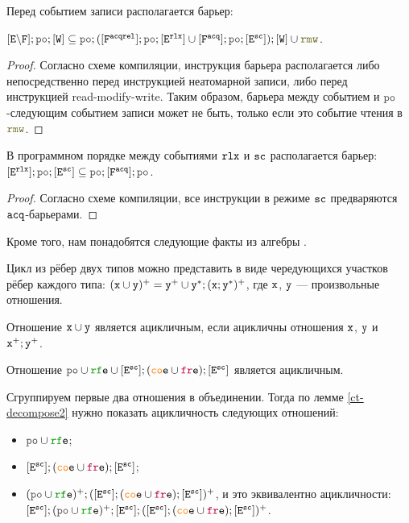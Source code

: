 \begin{lm}  \label{sb-w-sync}
  Перед событием записи располагается барьер:

  $[\lE \backslash \lF] ; \lPO ; [\lW] \subseteq \lPO ; ([\Far] ; \lPO ; [\lE^{\rlx}] \cup [\Fa] ; \lPO ; [\lE^{\sco}]) ; [\lW] \cup \lRMW$.
\end{lm}
\begin{proof}
  Согласно схеме компиляции, инструкция барьера располагается либо непосредственно перед инструкцией неатомарной записи, либо перед инструкцией read-modify-write. Таким образом, барьера между событием и $\lPO$-следующим событием записи может не быть, только если это событие чтения в $\lRMW$.
\end{proof}

\begin{lm}  \label{sb-sc-sync}
  В программном порядке между событиями $\mathtt{rlx}$ и ${\mathtt{sc}}$ располагается барьер:  $[\lE^{\rlx}] ; \lPO ; [\lE^{\sco}] \subseteq \lPO ; [\Fa] ; \lPO$.
\end{lm}
\begin{proof}
  Согласно схеме компиляции, все инструкции в режиме ${\mathtt{sc}}$ предваряются ${\mathtt{acq}}$-барьерами. 
\end{proof}

Кроме того, нам понадобятся следующие факты из алгебры \cite{hahn-repo}.

\begin{lm} \label{ct-decompose1}
  Цикл из рёбер двух типов можно представить в виде чередующихся участков рёбер каждого типа: $(\mathtt{x} \cup \mathtt{y})^{+} = \mathtt{y}^{+} \cup \mathtt{y}^{*} ; (\mathtt{x} ; \mathtt{y}^{*})^{+}$, где $\mathtt{x}$, $\mathtt{y}$ --- произвольные отношения.
\end{lm}

\begin{lm} \label{ct-decompose2}
  Отношение $\mathtt{x}\cup \mathtt{y}$ является ацикличным, если ацикличны отношения $\mathtt{x}$, $\mathtt{y}$ и $\mathtt{x}^{+};\mathtt{y}^{+}$.
\end{lm}

\begin{thrm} \label{corr-causality-thm}
  Отношение $\lPO \cup \lRFE \cup [\lE^{\sco}] ; (\lCOE \cup \lFRE) ; [\lE^{\sco}]$ является ацикличным. 
\end{thrm}

Сгруппируем первые два отношения в объединении. Тогда по лемме \ref{ct-decompose2} нужно показать ацикличность следующих отношений:
\begin{itemize}
\item $\lPO \cup \lRFE$;
\item $[\lE^{\sco}] ; (\lCOE \cup \lFRE) ; [\lE^{\sco}]$;
\item $(\lPO \cup \lRFE)^{+} ; ([\lE^{\sco}] ; (\lCOE \cup \lFRE) ; [\lE^{\sco}])^{+}$, и это эквивалентно ацикличности:  $[\lE^{\sco}];(\lPO \cup \lRFE)^{+} ; [\lE^{\sco}] ; ([\lE^{\sco}] ; (\lCOE \cup \lFRE) ; [\lE^{\sco}])^{+}$. 
\end{itemize}

